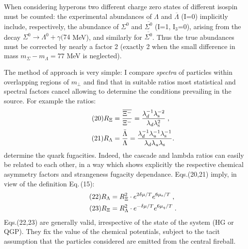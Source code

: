 \begin{mdframed}[linecolor=gray,roundcorner=12pt,backgroundcolor=Dandelion!15,linewidth=1pt,leftmargin=0cm,rightmargin=0cm,topline=true,bottomline=true,skipabove=12pt]
When considering hyperons two different charge zero states of different
isospin must be counted: the experimental abundances of $\Lambda$ and
$\overline{\Lambda}$ (I=0) implicitly include, respectively, the
abundance of $\Sigma^0$ and ${\overline{\Sigma^0}}$ (I=1, I$_3$=0),
arising from the decay $\Sigma^0\rightarrow\Lambda^0+\gamma(74$ MeV),
and similarly for ${\overline{\Sigma^0}}$. Thus the true abundances must
be corrected by nearly a factor 2 (exactly 2 when the small difference in
mass $m_\Sigma - m_\Lambda=77$ MeV is neglected). 
 
The method of approach is very simple: I compare {\it spectra} of
particles within overlapping regions of $m_\bot$ and find that in
suitable ratios most statistical and spectral factors cancel allowing to
determine the conditions prevailing in the source. For example the
ratios:
\begin{align*}
\tag{20} R_\Xi&={\overline{\Xi^-}\over {\Xi^-}} =
{{\lambda_d^{-1}\lambda_{\rm s}^{-2}}\over 
{\lambda_d\lambda_{\rm s}^2}}\;,\\
\tag{21} R_\Lambda&={{{{\bar \Lambda}}\over{\Lambda}}} =
{{\lambda_d^{-1}\lambda_u^{-1}\lambda_{\rm s}^{-1}}\over 
{\lambda_d\lambda_u\lambda_{\rm s}}} .
\end{align*}
determine the quark fugacities. Indeed, the cascade and lambda ratios can
easily be related to each other, in a way which shows explicitly the
respective chemical asymmetry factors and strangeness fugacity
dependance. Eqs.(20,21) imply, in view of the definition
Eq.\,(15):
\begin{align*}%
\tag{22} R_\Lambda&=R_\Xi^2 \cdot e^{2\delta\mu/T}e^{6\mu_{\rm s}/T}\;,\\
\tag{23} R_\Xi&=R_\Lambda^2 \cdot e^{-\delta\mu/T}e^{6\mu_q/T}\;.
\end{align*} 
Eqs.(22,23) are generally valid, irrespective of the state
of the system (HG or QGP). They fix the value of the chemical potentials,
subject to the tacit assumption that the particles considered are emitted
from the central fireball.
 

\end{mdframed}
